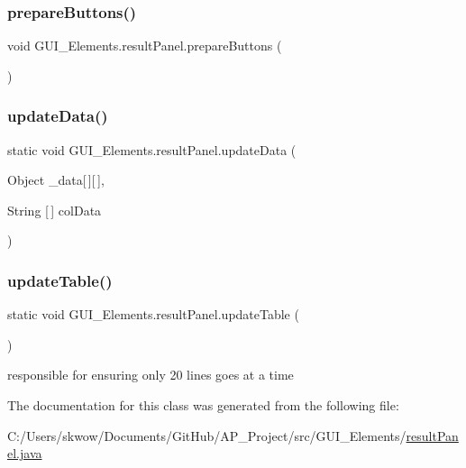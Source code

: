\subsubsection{\texorpdfstring{prepare\+Buttons()}{prepareButtons()}}
{\footnotesize\ttfamily void G\+U\+I\+\_\+\+Elements.\+result\+Panel.\+prepare\+Buttons (\begin{DoxyParamCaption}{ }\end{DoxyParamCaption})}

\hypertarget{class_g_u_i___elements_1_1result_panel_a1f5c577e0d7335cca042570a2d406c01}{}\label{class_g_u_i___elements_1_1result_panel_a1f5c577e0d7335cca042570a2d406c01} 
\subsubsection{\texorpdfstring{update\+Data()}{updateData()}}
{\footnotesize\ttfamily static void G\+U\+I\+\_\+\+Elements.\+result\+Panel.\+update\+Data (\begin{DoxyParamCaption}\item[{Object}]{\+\_\+data\mbox{[}$\,$\mbox{]}\mbox{[}$\,$\mbox{]},  }\item[{String \mbox{[}$\,$\mbox{]}}]{col\+Data }\end{DoxyParamCaption})\hspace{0.3cm}{\ttfamily [static]}}

\hypertarget{class_g_u_i___elements_1_1result_panel_a9b7265b21d672434bb1d53273ea82590}{}\label{class_g_u_i___elements_1_1result_panel_a9b7265b21d672434bb1d53273ea82590} 
\subsubsection{\texorpdfstring{update\+Table()}{updateTable()}}
{\footnotesize\ttfamily static void G\+U\+I\+\_\+\+Elements.\+result\+Panel.\+update\+Table (\begin{DoxyParamCaption}{ }\end{DoxyParamCaption})\hspace{0.3cm}{\ttfamily [static]}}



responsible for ensuring only 20 lines goes at a time 



The documentation for this class was generated from the following file\+:\begin{DoxyCompactItemize}
\item 
C\+:/\+Users/skwow/\+Documents/\+Git\+Hub/\+A\+P\+\_\+\+Project/src/\+G\+U\+I\+\_\+\+Elements/\hyperlink{result_panel_8java}{result\+Panel.\+java}\end{DoxyCompactItemize}
